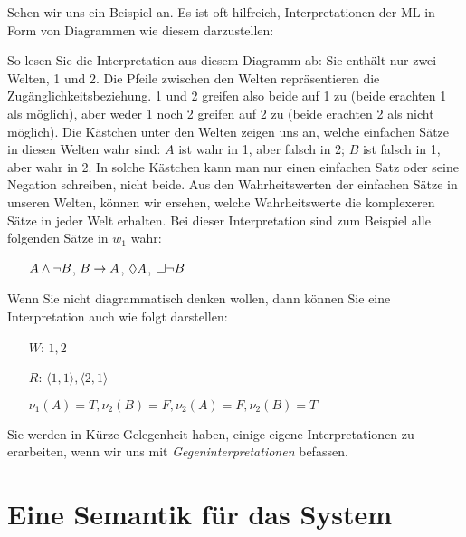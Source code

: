 Sehen wir uns ein Beispiel an. Es ist oft hilfreich, Interpretationen der ML in Form von Diagrammen wie diesem darzustellen:
\begin{center}
\end{center}
So lesen Sie die Interpretation aus diesem Diagramm ab: Sie enthält nur zwei Welten, 1 und 2. Die Pfeile zwischen den Welten repräsentieren die Zugänglichkeitsbeziehung. 1 und 2 greifen also beide auf 1 zu (beide erachten 1 als möglich), aber weder 1 noch 2 greifen auf 2 zu (beide erachten 2 als nicht möglich). Die Kästchen unter den Welten zeigen uns an, welche einfachen Sätze in diesen Welten wahr sind: $A$ ist wahr in 1, aber falsch in 2; $B$ ist falsch in 1, aber wahr in 2. In solche Kästchen kann man nur einen einfachen Satz oder seine Negation schreiben, nicht beide. Aus den Wahrheitswerten der einfachen Sätze in unseren Welten, können wir ersehen, welche Wahrheitswerte die komplexeren Sätze in jeder Welt erhalten. Bei dieser Interpretation sind zum Beispiel alle folgenden Sätze in $w_1$ wahr:
\begin{itemize}
	\item[]$A\wedge\neg B$, $B\rightarrow A$, $\Diamond A$, $\Box\neg B$
\end{itemize}
Wenn Sie nicht diagrammatisch denken wollen, dann können Sie eine Interpretation auch wie folgt darstellen:
\begin{itemize}
	\item[$W$:]$1,2$
	\item[$R$:]$\langle 1,1\rangle, \langle 2,1\rangle$
	\item[]$\nu_{1}(A)=T, \nu_{2}(B)=F, \nu_{2}(A)=F, \nu_{2}(B)=T$
\end{itemize}
Sie werden in Kürze Gelegenheit haben, einige eigene Interpretationen zu erarbeiten, wenn wir uns mit \emph{Gegeninterpretationen} befassen.

\section{Eine Semantik für das System \mlK}
\label{SemanticsK}

